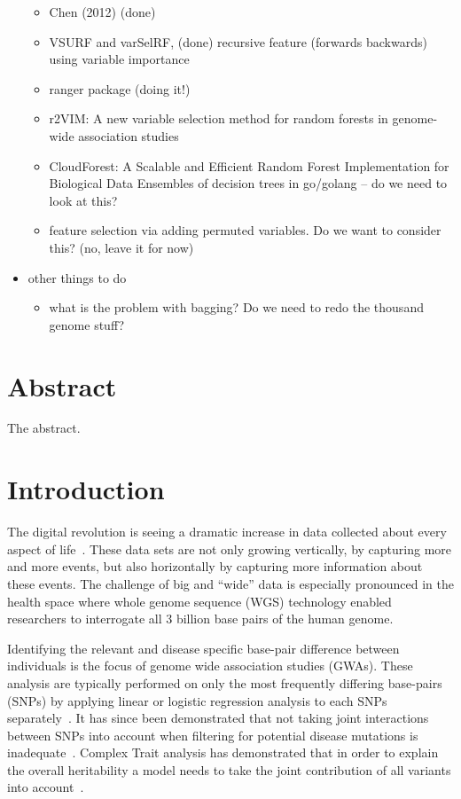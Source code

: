 \documentclass[10pt,a4paper]{article}  %
\begin{document}
\begin{itemize}
\begin{itemize}
  \item Chen (2012)  (done)
  \item VSURF and  varSelRF, (done) recursive feature (forwards backwards) using variable importance
  \item \cite{Wright.and.Ziegle.2016} ranger package (doing it!)
  \item  r2VIM: A new variable selection method for random forests in
    genome-wide association studies
  \item CloudForest: A Scalable and Efficient Random Forest
    Implementation for Biological Data
   Ensembles of decision trees in go/golang   --  do we need to look
   at this? 
  \item \cite{Tuv.et.al.2009} feature selection via adding permuted variables. Do we want to consider this? (no, leave it for now)
  \end{itemize}
\item other things to do
  \begin{itemize}
  \item what is the problem with bagging? Do we need to redo the thousand genome stuff?
  \end{itemize}
\end{itemize}


\clearpage

\section{Abstract}
The abstract.

\linenumbers

\section{Introduction}

The digital revolution is seeing a dramatic increase in data collected about every aspect of life~\cite{Loebbecke2015}.
These data sets are not only growing vertically, by capturing more and more events, but also horizontally by capturing
more information about these events.  The challenge of big and ``wide'' data is especially pronounced in the health
space where whole genome sequence (WGS) technology enabled researchers to interrogate all 3 billion base pairs of the
human genome.

Identifying the relevant and disease specific base-pair difference between individuals is the focus of genome wide association studies (GWAs).
These analysis are typically performed on only the most frequently differing base-pairs (SNPs) by applying linear or logistic regression analysis to each SNPs separately~\cite{CCC2007}.
It has since been demonstrated that not taking joint interactions between SNPs into account when filtering for potential disease mutations is inadequate~\cite{Manolio2009}. 
Complex Trait analysis has demonstrated that in order to explain the overall heritability a model needs to take the joint contribution of all variants into account~\cite{Yang2011}.
\end{document}
